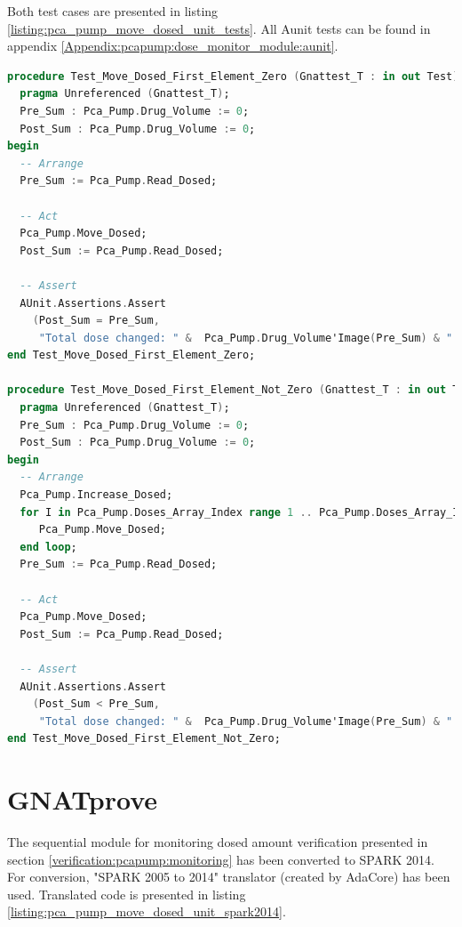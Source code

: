 Both test cases are presented in listing \ref{listing:pca_pump_move_dosed_unit_tests}. All Aunit tests can be found in appendix \ref{Appendix:pcapump:dose_monitor_module:aunit}.

\singlespacing
\begin{lstlisting}[language=ada, frame=single, gobble=0, caption={AUnit tests for Move\_Dosed procedure}, label={listing:pca_pump_move_dosed_unit_tests}]
procedure Test_Move_Dosed_First_Element_Zero (Gnattest_T : in out Test) is
  pragma Unreferenced (Gnattest_T);
  Pre_Sum : Pca_Pump.Drug_Volume := 0;
  Post_Sum : Pca_Pump.Drug_Volume := 0;
begin
  -- Arrange
  Pre_Sum := Pca_Pump.Read_Dosed;

  -- Act
  Pca_Pump.Move_Dosed;
  Post_Sum := Pca_Pump.Read_Dosed;

  -- Assert
  AUnit.Assertions.Assert
    (Post_Sum = Pre_Sum,
     "Total dose changed: " &  Pca_Pump.Drug_Volume'Image(Pre_Sum) & " /= " &  Pca_Pump.Drug_Volume'Image(Post_Sum));
end Test_Move_Dosed_First_Element_Zero;

procedure Test_Move_Dosed_First_Element_Not_Zero (Gnattest_T : in out Test) is
  pragma Unreferenced (Gnattest_T);
  Pre_Sum : Pca_Pump.Drug_Volume := 0;
  Post_Sum : Pca_Pump.Drug_Volume := 0;
begin
  -- Arrange
  Pca_Pump.Increase_Dosed;
  for I in Pca_Pump.Doses_Array_Index range 1 .. Pca_Pump.Doses_Array_Index'Last-1 loop
     Pca_Pump.Move_Dosed;
  end loop;
  Pre_Sum := Pca_Pump.Read_Dosed;

  -- Act
  Pca_Pump.Move_Dosed;
  Post_Sum := Pca_Pump.Read_Dosed;

  -- Assert
  AUnit.Assertions.Assert
    (Post_Sum < Pre_Sum,
     "Total dose changed: " &  Pca_Pump.Drug_Volume'Image(Pre_Sum) & " should be greater than " &  Pca_Pump.Drug_Volume'Image(Post_Sum));
end Test_Move_Dosed_First_Element_Not_Zero;
\end{lstlisting}
\doublespacing


\section{GNATprove}
\label{verification:gnatprove}

The sequential module for monitoring dosed amount verification presented in section \ref{verification:pcapump:monitoring} has been converted to SPARK 2014. For conversion, "SPARK 2005 to 2014" translator (created by AdaCore) has been used. Translated code is presented in listing \ref{listing:pca_pump_move_dosed_unit_spark2014}.


